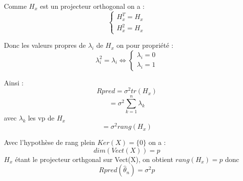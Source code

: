 Comme $H_x$ est un projecteur orthogonal on a :
\smallbreak
$$
\begin{cases}
    H_x^T = H_x  \\
    H_x^2 = H_x
\end{cases} $$

Donc les valeurs propres de $\lambda_i$ de $H_x$ on pour propriété :
$$\lambda_i^2 = \lambda_i \Longleftrightarrow
\begin{cases}
    \lambda_i = 0  \\
    \lambda_i = 1
\end{cases} $$

Ainsi :
$$ Rpred = \sigma^2 tr(H_x)$$
$$ = \sigma^2 \sum^n_{k=1} \lambda_k$$ avec $\lambda_k$ les vp de $H_x$
$$ = \sigma^2 rang(H_x)$$

Avec l'hypothèse de rang plein $Ker(X) = \{0\}$ on a :
$$dim(Vect(X)) = p$$
$H_x$ étant le projecteur orthgonal sur Vect(X), on obtient $rang(H_x) = p$
donc
$$Rpred(\hat{\theta}_n) = \sigma^2 p$$



